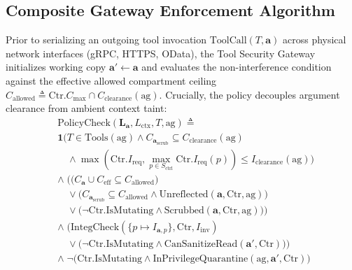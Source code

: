 \documentclass[conference,10pt]{IEEEtran}
\begin{document}
\subsection{Composite Gateway Enforcement Algorithm}
Prior to serializing an outgoing tool invocation $\text{ToolCall}(T, \mathbf{a})$ across physical network interfaces (gRPC, HTTPS, OData), the Tool Security Gateway initializes working copy $\mathbf{a}' \leftarrow \mathbf{a}$ and evaluates the non-interference condition against the effective allowed compartment ceiling $C_{\text{allowed}} \triangleq \text{Ctr}.C_{\text{max}} \cap C_{\text{clearance}}(\text{ag})$. Crucially, the policy decouples argument clearance from ambient context taint:
\begin{equation}
\label{eq:policy}
\begin{split}
&\text{PolicyCheck}(\mathbf{L}_{\mathbf{a}}, L_{\text{ctx}}, T, \text{ag}) \triangleq \\
&\mathbf{1}\Big( T \in \text{Tools}(\text{ag}) \land C_{\mathbf{a}_{\text{scrub}}} \subseteq C_{\text{clearance}}(\text{ag}) \\
&\quad \land \max(\text{Ctr}.I_{\text{req}}, \max_{p \in S_{\text{ctrl}}} \text{Ctr}.I_{\text{req}}(p)) \le I_{\text{clearance}}(\text{ag}) \Big) \\
&\land \; \Big( \big(C_{\mathbf{a}} \cup C_{\text{eff}} \subseteq C_{\text{allowed}}\big) \\
&\quad \lor \big(C_{\mathbf{a}_{\text{scrub}}} \subseteq C_{\text{allowed}} \land \text{Unreflected}(\mathbf{a}, \text{Ctr}, \text{ag})\big) \\
&\quad \lor \big(\neg \text{Ctr.IsMutating} \land \text{Scrubbed}(\mathbf{a}, \text{Ctr}, \text{ag})\big) \Big) \\
&\land \; \Big( \text{IntegCheck}(\{p \mapsto I_{\mathbf{a}, p}\}, \text{Ctr}, I_{\text{inv}}) \\
&\quad \lor \big(\neg \text{Ctr.IsMutating} \land \text{CanSanitizeRead}(\mathbf{a}', \text{Ctr})\big) \Big) \\
&\land \; \neg\big(\text{Ctr.IsMutating} \land \text{InPrivilegeQuarantine}(\text{ag}, \mathbf{a}', \text{Ctr})\big)
\end{split}
\end{equation}
\end{document}

